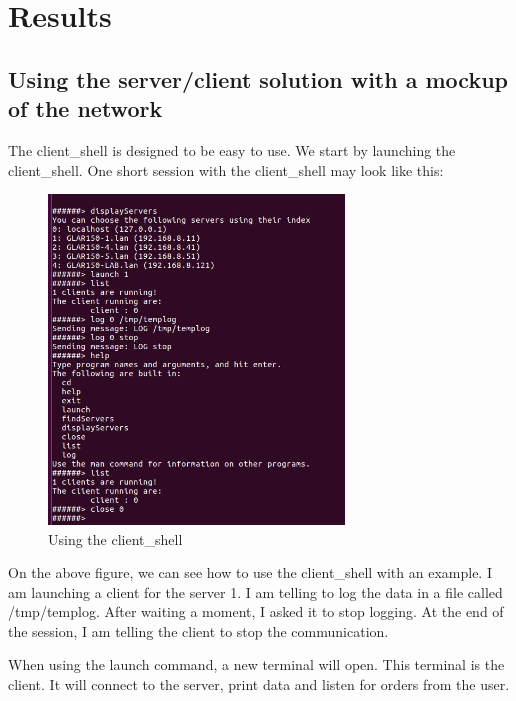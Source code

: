 \chapter{Results}

\section{Using the server/client solution with a mockup of the network}


The client\_shell is designed to be easy to use.
We start by launching the client\_shell. One short session with the client\_shell may look like this:


\begin{figure}[H]
\begin{center}
\includegraphics[width=0.7\textwidth]{image/clientshell.jpg}%
\caption{Using the client\_shell}%
\label{figure:clientshell}%
\end{center}
\end{figure}

On the above figure, we can see how to use the client\_shell with an example.
I am launching a client for the server 1. I am telling to log the data in a file called /tmp/templog. After waiting a moment, I asked it to stop logging. At the end of the session, I am telling the client to stop the communication.


When using the launch command, a new terminal will open. This terminal is the client. It will connect to the server, print data and listen for orders from the user.

